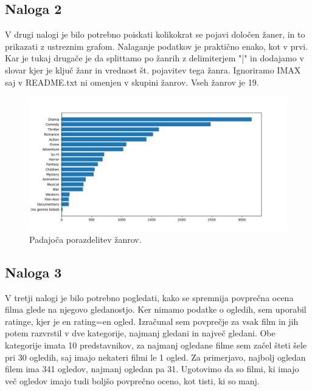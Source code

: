 \documentclass[a4paper,11pt]{article}
\begin{document}
\subsection{Naloga 2}
V drugi nalogi je bilo potrebno poiskati kolikokrat se pojavi določen žaner, in to prikazati z ustreznim grafom. Nalaganje podatkov je praktično enako, kot v prvi. Kar je tukaj drugače je da splittamo po žanrih z delimiterjem "|" in dodajamo v slovar kjer je ključ žanr in vrednost št. pojavitev tega žanra. Ignoriramo IMAX saj v README.txt ni omenjen v skupini žanrov. Vseh žanrov je 19.


\begin{figure}[htbp]
\begin{center}
\includegraphics[scale=0.6]{../slike/zanri_porazdelitev.png}
\caption{Padajoča porazdelitev žanrov.}
\label{zanri_slika}
\end{center}
\end{figure}
\pagebreak


\subsection{Naloga 3}
V tretji nalogi je bilo potrebno pogledati, kako se spremnija povprečna ocena filma glede na njegovo gledanostjo. Ker nimamo podatke o ogledih, sem uporabil ratinge, kjer je en rating=en ogled. Izračunal sem povprečje za vsak film in jih potem razvrstil v dve kategorije, najmanj gledani in največ gledani. Obe kategorije imata 10 predstavnikov, za najmanj ogledane filme sem začel šteti šele pri 30 ogledih, saj imajo nekateri filmi le 1 ogled. Za primerjavo, najbolj ogledan filem ima 341 ogledov, najmanj ogledan pa 31. Ugotovimo da so filmi, ki imajo več ogledov imajo tudi boljšo povprečno oceno, kot tisti, ki so manj.
\end{document}
